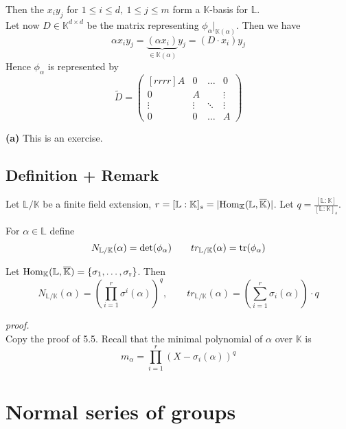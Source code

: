 \documentclass[12pt]{book}
\begin{document}
\begin{spacing}{1.3}
\begin{compactitem}
Then the $x_iy_j$ for $1 \leqslant i \leqslant d, \ 1 \leqslant j \leqslant m$ form a $\mathbb{K}$-basis for $\mathbb{L}$. \\
Let now $D \in \mathbb{K}^{d \times d}$ be the matrix representing $\phi_{\alpha}|_{\mathbb{K}(\alpha)}$. Then we have\\
$$\alpha x_i y_j = \underbrace{\left(\alpha x_i\right)}_{\in \mathbb{K}(\alpha)}y_j = \left(D \cdot x_i\right) y_j$$
Hence $\phi_{\alpha}$ is represented by
$$\tilde{D}= \begin{pmatrix}[rrrr] A & 0 & \ldots & 0 \\ 0 & A & & \vdots \\ \vdots & \vdots & \ddots & \vdots \\ 0 & 0 & \ldots & A \end{pmatrix}$$
\item[\textbf{(a)}] This is an exercise.
\end{compactitem}

\subsection{Definition + Remark} %
Let $\mathbb{L}/\mathbb{K}$ be a finite field extension, $r=[\mathbb{L}:\mathbb{K}]_s=\vert \rm{Hom}_{\mathbb{K}}(\mathbb{L}, \overline{\mathbb{K}}) \vert$. Let $q=\frac{[\mathbb{L}:\mathbb{K}]}{[\mathbb{L}:\mathbb{K}]_s}$.
\begin{compactenum}
\item For $\alpha \in \mathbb{L}$ define 
$$N_{\mathbb{L}/\mathbb{K}}(\alpha)=\det(\phi_{\alpha}) \qquad tr_{\mathbb{L}/\mathbb{K}}(\alpha)=\rm{tr}(\phi_{\alpha})$$
\item Let $\rm{Hom}_{\mathbb{K}}(\mathbb{L}, \overline{\mathbb{K}})=\{\sigma_1, \ldots, \sigma_r\}$. Then
$$N_{\mathbb{L}/\mathbb{K}}(\alpha)=\left(\prod_{i=1}^r \sigma^{i}(\alpha)\right)^q, \qquad tr_{\mathbb{L}/\mathbb{K}}(\alpha)=\left(\sum_{i=1}^r \sigma_{i}(\alpha)\right) \cdot q $$
\end{compactenum}
\textit{proof.}\\
Copy the proof of 5.5. Recall that the minimal polynomial of $\alpha$ over $\mathbb{K}$ is 
$$m_{\alpha}=\prod_{i=1}^r \left(X-\sigma_i(\alpha)\right)^q$$


\renewcommand*\thesection{§ \arabic{section}\quad}
\section{Normal series of groups}
\renewcommand*\thesection{\arabic{section}}


\end{spacing}
\end{document}
